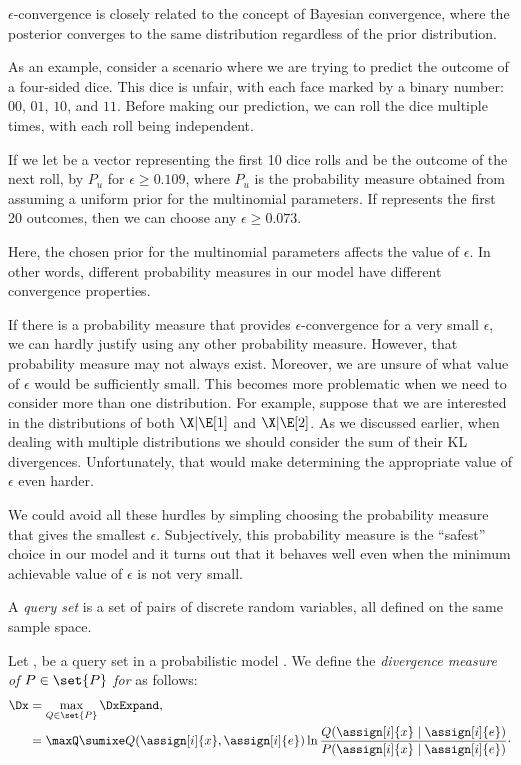 $\epsilon$-convergence is closely related to the concept of Bayesian convergence, where the posterior converges to
the same distribution regardless of the prior distribution.

As an example, consider a scenario where we are trying to predict the outcome of a four-sided dice. This dice is
unfair, with each face marked by a binary number: $00$, $01$, $10$, and $11$.
Before making our prediction, we can roll the dice multiple times, with each roll being independent.

If we let \E be a vector representing the first 10 dice rolls and \X be the outcome of the next roll,
\XIE \econverges by $P_u$ for $\epsilon \geq 0.109$, where $P_u$ is the probability measure obtained from
assuming a uniform prior for the multinomial parameters.
If \E represents the first 20 outcomes, then we can choose any $\epsilon \geq 0.073$.

Here, the chosen prior for the multinomial parameters affects the value of $\epsilon$.
In other words, different probability measures in our model have different convergence properties.

If there is a probability measure that provides $\epsilon$-convergence for a very small $\epsilon$, we can hardly
justify using any other probability measure.
However, that probability measure may not always exist.
Moreover, we are unsure of what value of $\epsilon$ would be sufficiently small.
This becomes more problematic when we need to consider more than one distribution.
For example, suppose that we are interested in the distributions of both $\X|\E[1]$ and $\X|\E[2]$.
As we discussed earlier, when dealing with multiple distributions we should consider the sum of their KL divergences.
Unfortunately, that would make determining the appropriate value of $\epsilon$ even harder.

We could avoid all these hurdles by simpling choosing the probability measure that gives the smallest $\epsilon$.
Subjectively, this probability measure is the ``safest'' choice in our model and it turns out that it behaves well even
when the minimum achievable value of $\epsilon$ is not very small.

\begin{definition}
    A \emph{query set} is a set of pairs of discrete random variables, all defined on the same sample space.
\end{definition}

\begin{definition}
    Let \Xpairs, be a query set in a probabilistic model \model.
    We define the \emph{divergence measure of $P \in \set{P}$ for \Qset} as follows:
    \begin{align}
        \label{eq:div_def}
        \Dx &= \max_{Q \in \set{P}} \DxExpand, \\
        &= \maxQ \sumixe Q(\assign[i]{x} , \assign[i]{e}) \ln
        \frac{Q(\assign[i]{x} \mid \assign[i]{e})}{P(\assign[i]{x} \mid \assign[i]{e})} \cdot
    \end{align}
\end{definition}

